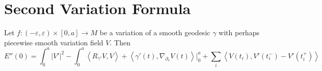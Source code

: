 \section{Second Variation Formula}
\label{section-second-variation}

\begin{theorem}
\label{theorem-second-variation-formula}
Let $f:(-\varepsilon,\varepsilon)\times[0,a]
\to M$ be a variation of a smooth
geodesic $\gamma$ with perhaps piecewise
smooth variation field $V$. Then
\begin{equation}
\label{equation-second-variation-formula}
E''(0)=\int_0^a |V'|^2-\int_0^a \left\langle{}R_{\gamma'}V,V\right\rangle{}+
\left\langle{}\gamma'(t),\nabla_{\partial_s}V(t)
\right\rangle{}|_{0}^a+
\sum_{i}\left\langle{}V(t_i),V'(t^-_i)-V'(t^+_i)
\right\rangle{}
\end{equation}
\end{theorem}


